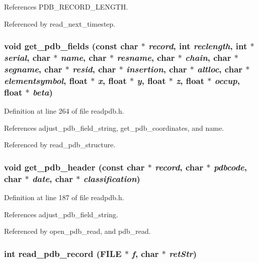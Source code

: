 References PDB\_\-RECORD\_\-LENGTH.

Referenced by read\_\-next\_\-timestep.
\subsubsection{\setlength{\rightskip}{0pt plus 5cm}void get\_\-pdb\_\-fields (const char $\ast$ {\em record}, int {\em reclength}, int $\ast$ {\em serial}, char $\ast$ {\em name}, char $\ast$ {\em resname}, char $\ast$ {\em chain}, char $\ast$ {\em segname}, char $\ast$ {\em resid}, char $\ast$ {\em insertion}, char $\ast$ {\em altloc}, char $\ast$ {\em elementsymbol}, float $\ast$ {\em x}, float $\ast$ {\em y}, float $\ast$ {\em z}, float $\ast$ {\em occup}, float $\ast$ {\em beta})\hspace{0.3cm}{\tt  [static]}}\label{readpdb_8h_a17}




Definition at line 264 of file readpdb.h.

References adjust\_\-pdb\_\-field\_\-string, get\_\-pdb\_\-coordinates, and name.

Referenced by read\_\-pdb\_\-structure.
\subsubsection{\setlength{\rightskip}{0pt plus 5cm}void get\_\-pdb\_\-header (const char $\ast$ {\em record}, char $\ast$ {\em pdbcode}, char $\ast$ {\em date}, char $\ast$ {\em classification})\hspace{0.3cm}{\tt  [static]}}\label{readpdb_8h_a15}




Definition at line 187 of file readpdb.h.

References adjust\_\-pdb\_\-field\_\-string.

Referenced by open\_\-pdb\_\-read, and pdb\_\-read.
\subsubsection{\setlength{\rightskip}{0pt plus 5cm}int read\_\-pdb\_\-record (FILE $\ast$ {\em f}, char $\ast$ {\em ret\-Str})\hspace{0.3cm}{\tt  [static]}}\label{readpdb_8h_a11}




